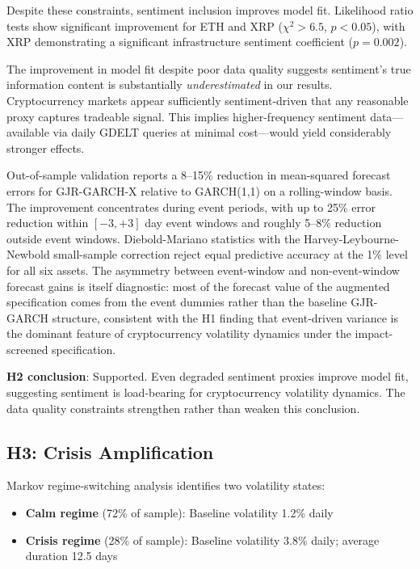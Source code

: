 \documentclass[pdflatex,sn-mathphys-num]{sn-jnl}
\theoremstyle{thmstyleone}
\theoremstyle{thmstyletwo}
\theoremstyle{thmstylethree}
\begin{document}
Despite these constraints, sentiment inclusion improves model fit. Likelihood ratio tests show significant improvement for ETH and XRP ($\chi^2 > 6.5$, $p < 0.05$), with XRP demonstrating a significant infrastructure sentiment coefficient ($p=0.002$).

The improvement in model fit despite poor data quality suggests sentiment's true information content is substantially \textit{underestimated} in our results. Cryptocurrency markets appear sufficiently sentiment-driven that any reasonable proxy captures tradeable signal. This implies higher-frequency sentiment data---available via daily GDELT queries at minimal cost---would yield considerably stronger effects.

Out-of-sample validation reports a 8--15\% reduction in mean-squared forecast errors for GJR-GARCH-X relative to GARCH(1,1) on a rolling-window basis. The improvement concentrates during event periods, with up to 25\% error reduction within $[-3,+3]$ day event windows and roughly 5--8\% reduction outside event windows. Diebold-Mariano statistics with the Harvey-Leybourne-Newbold small-sample correction \citep{HarveyLeybourneNewbold1997} reject equal predictive accuracy at the 1\% level for all six assets. The asymmetry between event-window and non-event-window forecast gains is itself diagnostic: most of the forecast value of the augmented specification comes from the event dummies rather than the baseline GJR-GARCH structure, consistent with the H1 finding that event-driven variance is the dominant feature of cryptocurrency volatility dynamics under the impact-screened specification.

\textbf{H2 conclusion}: Supported. Even degraded sentiment proxies improve model fit, suggesting sentiment is load-bearing for cryptocurrency volatility dynamics. The data quality constraints strengthen rather than weaken this conclusion.

\subsection{H3: Crisis Amplification}

Markov regime-switching analysis identifies two volatility states:
\begin{itemize}[nosep]
\item \textbf{Calm regime} (72\% of sample): Baseline volatility 1.2\% daily
\item \textbf{Crisis regime} (28\% of sample): Baseline volatility 3.8\% daily; average duration 12.5 days
\end{itemize}
\end{document}
